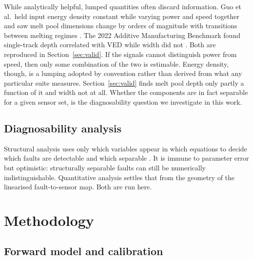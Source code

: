 \documentclass[final,5p,times,twocolumn]{elsarticle}
\begin{document}
While analytically helpful, lumped quantities often discard information. Guo et al.\ held input
energy density constant while varying power and speed together and saw melt pool
dimensions change by orders of magnitude with transitions between melting
regimes \cite{Guo2019}. The 2022 Additive Manufacturing Benchmark found
single-track depth correlated with VED while width did not \cite{Weaver2024}.
Both are reproduced in Section~\ref{sec:valid}. If the signals cannot distinguish power from speed, then only some combination
of the two is estimable. Energy density, though, is a lumping adopted by convention rather than derived from what any particular suite measures. Section~\ref{sec:valid} finds melt pool depth only partly a function of it and width not at all. Whether the components are in fact separable for a given
sensor set, is the diagnosability question we investigate in this work.

\subsection{Diagnosability analysis}

Structural analysis uses only which variables appear in which equations to
decide which faults are detectable and which separable \cite{Krysander2008}. It
is immune to parameter error but optimistic: structurally separable faults can
still be numerically indistinguishable. Quantitative analysis settles that from
the geometry of the linearised fault-to-sensor map. Both are run here.

\section{Methodology}

\subsection{Forward model and calibration}
\end{document}
